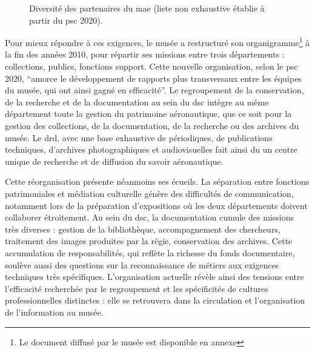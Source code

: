 \begin{figure}[htbp]
	
	\caption{Diversité des partenaires du \ac{mae} (liste non exhaustive établie à partir du \ac{psc} 2020).}
	\label{fig:schem_partenaires}
\end{figure}

Pour mieux répondre à ces exigences, le musée a restructuré son organigramme\footnote{Le document diffusé par le musée est disponible en annexe } à la fin des années 2010, pour répartir ses missions entre trois départements : collections, publics, fonctions support. Cette nouvelle organisation, selon le \ac{psc} 2020, \enquote{amorce le développement de rapports plus transversaux entre les équipes du musée, qui ont ainsi gagné en efficacité}. Le regroupement de la conservation, de la recherche et de la documentation au sein du \ac{dsc} intègre au même département toute la gestion du patrimoine aéronautique, que ce soit pour la gestion des collections, de la documentation, de la recherche  ou des archives du musée. Le \acf{drd}, avec une base exhaustive de périodiques, de publications techniques, d'archives photographiques et audiovisuelles fait ainsi du \mae un centre unique de recherche et de diffusion du savoir aéronautique.

Cette réorganisation présente néanmoins ses écueils. La séparation entre fonctions patrimoniales et médiation culturelle génère des difficultés de communication, notamment lors de la préparation d'expositions où les deux départements doivent collaborer étroitement. Au sein du \ac{dsc}, la documentation cumule des missions très diverses : gestion de la bibliothèque, accompagnement des chercheurs, traitement des images produites par la régie, conservation des archives. Cette accumulation de responsabilités, qui reflète la richesse du fonds documentaire, soulève aussi des questions sur la reconnaissance de métiers aux exigences techniques très spécifiques. L'organisation actuelle révèle ainsi des tensions entre l'efficacité recherchée par le regroupement et les spécificités de cultures professionnelles distinctes : elle se retrouvera dans la circulation et l'organisation de l'information au musée.